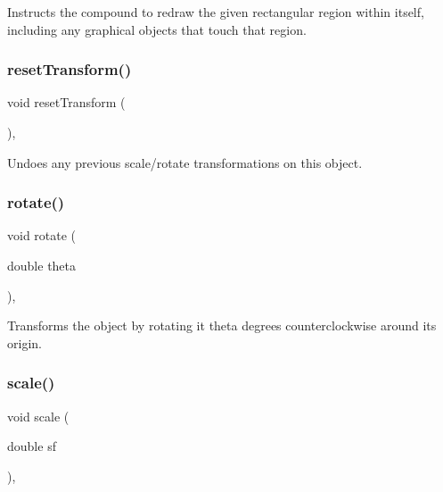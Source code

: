 Instructs the compound to redraw the given rectangular region within itself, including any graphical objects that touch that region. 

\mbox{\label{classGObject_a6022a1fd1e5dcd2fd5585e5a36aa3f37}} 
\subsubsection{\texorpdfstring{reset\+Transform()}{resetTransform()}}
{\footnotesize\ttfamily void reset\+Transform (\begin{DoxyParamCaption}{ }\end{DoxyParamCaption})\hspace{0.3cm}{\ttfamily [virtual]}, {\ttfamily [inherited]}}



Undoes any previous scale/rotate transformations on this object. 

\mbox{\label{classGObject_ae1ffaa12185dfd5ba464f7d87c329e26}} 
\subsubsection{\texorpdfstring{rotate()}{rotate()}}
{\footnotesize\ttfamily void rotate (\begin{DoxyParamCaption}\item[{double}]{theta }\end{DoxyParamCaption})\hspace{0.3cm}{\ttfamily [virtual]}, {\ttfamily [inherited]}}



Transforms the object by rotating it {\ttfamily theta} degrees counterclockwise around its origin. 

\mbox{\label{classGObject_ad2e1900f730475c2d044817db03b38d6}} 
\subsubsection{\texorpdfstring{scale()}{scale()}\hspace{0.1cm}{\footnotesize\ttfamily [1/2]}}
{\footnotesize\ttfamily void scale (\begin{DoxyParamCaption}\item[{double}]{sf }\end{DoxyParamCaption})\hspace{0.3cm}{\ttfamily [virtual]}, {\ttfamily [inherited]}}



